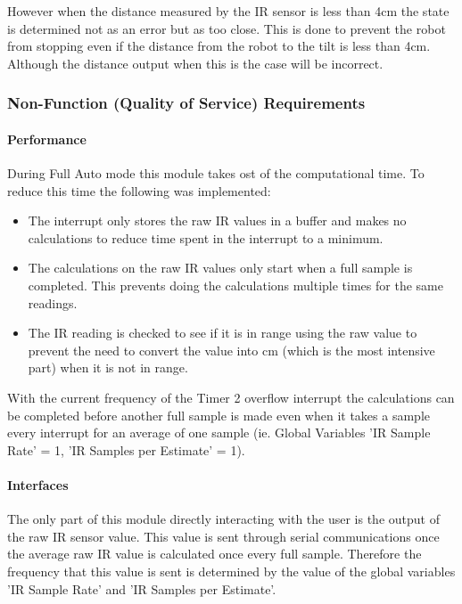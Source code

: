 \documentclass{article}
\begin{document}
However when the distance measured by the IR sensor is less than 4cm the state is determined not as an error but as too close. This is done to prevent the robot from stopping even if the distance from the robot to the tilt is less than 4cm. Although the distance output when this is the case will be incorrect.  

\subsubsection{Non-Function (Quality of Service) Requirements}
\paragraph{Performance}
During Full Auto mode this module takes ost of the computational time. To reduce this time the following was implemented:
\begin{itemize}
	\item The interrupt only stores the raw IR values in a buffer and makes no calculations to reduce time spent in the interrupt to a minimum.
	\item The calculations on the raw IR values only start when a full sample is completed. This prevents doing the calculations multiple times for the same readings.
	\item The IR reading is checked to see if it is in range using the raw value to prevent the need to convert the value into cm (which is the most intensive part) when it is not in range. 
\end{itemize}
With the current frequency of the Timer 2 overflow interrupt the calculations can be completed before another full sample is made even when it takes a sample every interrupt for an average of one sample (ie. Global Variables 'IR Sample Rate' = 1,  'IR Samples per Estimate' = 1).

\paragraph{Interfaces}

The only part of this module directly interacting with the user is the output of the raw IR sensor value. This value is sent through serial communications once the average raw IR value is calculated once every full sample. Therefore the frequency that this value is sent is determined by the value of the global variables 'IR Sample Rate' and 'IR Samples per Estimate'. 
\end{document}
